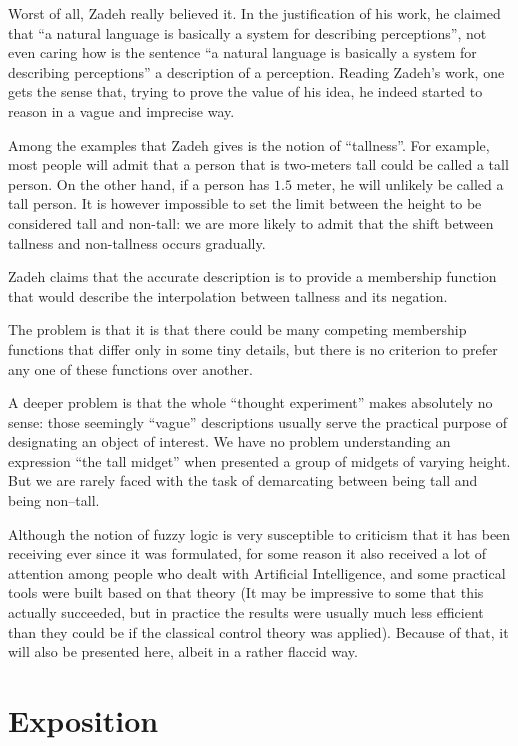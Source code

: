 Worst of all, Zadeh really believed it. In the justification
of his work, he claimed that ``a natural language is basically
a system for describing perceptions''\cite{Zadeh2008}, not
even caring how is the sentence ``a natural language is basically
a system for describing perceptions'' a description of
a perception. Reading Zadeh's work, one gets the sense that,
trying to prove the value of his idea, he indeed started to
reason in a vague and imprecise way.

Among the examples that Zadeh gives is the notion of ``tallness''.
For example, most people will admit that a person that is
two-meters tall could be called a tall person. On the other
hand, if a person has $1.5$ meter, he will unlikely be called
a tall person. It is however impossible to set the limit between
the height to be considered tall and non-tall: we are more
likely to admit that the shift between tallness and non-tallness
occurs gradually.

Zadeh claims that the accurate description is to provide
a membership function that would describe the interpolation
between tallness and its negation.

The problem is that it is that there could be many competing
membership functions that differ only in some tiny details,
but there is no criterion to prefer any one of these functions
over another.

A deeper problem is that the whole ``thought experiment''
makes absolutely no sense: those seemingly ``vague''
descriptions usually serve the practical purpose
of designating an object of interest. We have no problem
understanding an expression ``the tall midget'' when
presented a group of midgets of varying height. But we
are rarely faced with the task of demarcating between
being tall and being non--tall.

Although the notion of fuzzy logic is very susceptible to
criticism that it has been receiving ever since it was
formulated, for some reason it also received a lot of attention
among people who dealt with Artificial Intelligence, and
some practical tools were built based on that theory
(It may be impressive to some that this actually succeeded,
but in practice the results were usually much less
efficient than they could be if the classical control
theory was applied).
Because of that, it will also be presented here, albeit
in a rather flaccid way.

\section{Exposition}

